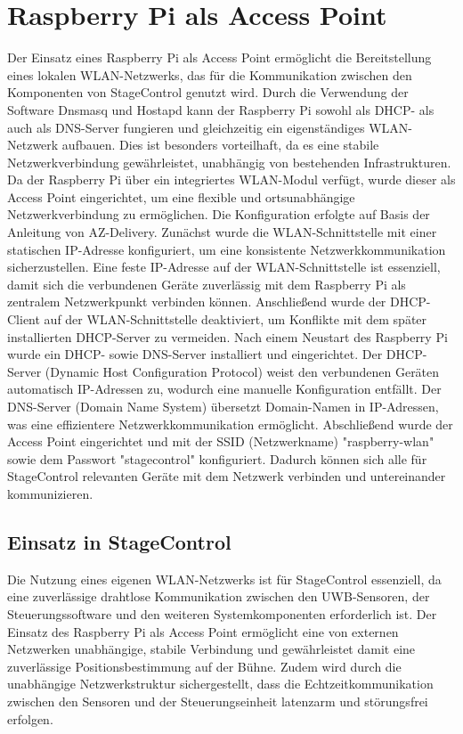 \section{Raspberry Pi als Access Point} \label{RaspberryAccessPoint}
Der Einsatz eines Raspberry Pi als Access Point ermöglicht die Bereitstellung eines lokalen WLAN-Netzwerks, das für die Kommunikation zwischen den Komponenten von StageControl genutzt wird. Durch die Verwendung der Software Dnsmasq und Hostapd kann der Raspberry Pi sowohl als DHCP- als auch als DNS-Server fungieren und gleichzeitig ein eigenständiges WLAN-Netzwerk aufbauen. Dies ist besonders vorteilhaft, da es eine stabile Netzwerkverbindung gewährleistet, unabhängig von bestehenden Infrastrukturen.
Da der Raspberry Pi über ein integriertes WLAN-Modul verfügt, wurde dieser als Access Point eingerichtet, um eine flexible und ortsunabhängige Netzwerkverbindung zu ermöglichen. Die Konfiguration erfolgte auf Basis der Anleitung von AZ-Delivery.
Zunächst wurde die WLAN-Schnittstelle mit einer statischen IP-Adresse konfiguriert, um eine konsistente Netzwerkkommunikation sicherzustellen. Eine feste IP-Adresse auf der WLAN-Schnittstelle ist essenziell, damit sich die verbundenen Geräte zuverlässig mit dem Raspberry Pi als zentralem Netzwerkpunkt verbinden können. Anschließend wurde der DHCP-Client auf der WLAN-Schnittstelle deaktiviert, um Konflikte mit dem später installierten DHCP-Server zu vermeiden.
Nach einem Neustart des Raspberry Pi wurde ein DHCP- sowie DNS-Server installiert und eingerichtet. Der DHCP-Server (Dynamic Host Configuration Protocol) weist den verbundenen Geräten automatisch IP-Adressen zu, wodurch eine manuelle Konfiguration entfällt. Der DNS-Server (Domain Name System) übersetzt Domain-Namen in IP-Adressen, was eine effizientere Netzwerkkommunikation ermöglicht.
Abschließend wurde der Access Point eingerichtet und mit der SSID (Netzwerkname) "raspberry-wlan" sowie dem Passwort "stagecontrol" konfiguriert. Dadurch können sich alle für StageControl relevanten Geräte mit dem Netzwerk verbinden und untereinander kommunizieren. \parencite{RaspberryPiAccessPoint}

\newpage
\subsection{Einsatz in StageControl}
Die Nutzung eines eigenen WLAN-Netzwerks ist für StageControl essenziell, da eine zuverlässige drahtlose Kommunikation zwischen den UWB-Sensoren, der Steuerungssoftware und den weiteren Systemkomponenten erforderlich ist. Der Einsatz des Raspberry Pi als Access Point ermöglicht eine von externen Netzwerken unabhängige, stabile Verbindung und gewährleistet damit eine zuverlässige Positionsbestimmung auf der Bühne. Zudem wird durch die unabhängige Netzwerkstruktur sichergestellt, dass die Echtzeitkommunikation zwischen den Sensoren und der Steuerungseinheit latenzarm und störungsfrei erfolgen.

